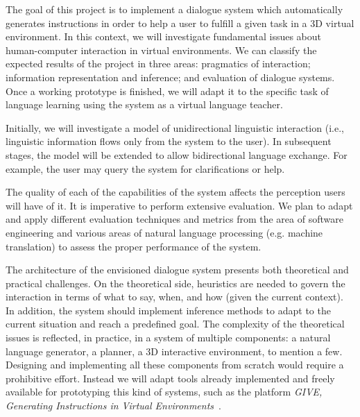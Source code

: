 
The goal of this project is to implement a dialogue system which automatically
generates instructions in order to help a user to fulfill a
given task in a 3D virtual environment. In this context, we will investigate
fundamental issues about human-computer interaction in virtual environments. We
can classify the expected results of the project in three areas: pragmatics
of interaction;  information representation and inference; and evaluation of
dialogue systems. Once a working prototype is finished, we will adapt it to
the specific task of language learning using the system as a virtual language
teacher. 

Initially, we will investigate a model of unidirectional linguistic
interaction (i.e., linguistic information flows only from the system to the
user). In subsequent stages, the model will be extended to allow bidirectional
language exchange. For example, the user may query the system for clarifications or help.

The quality of each of the capabilities of the system affects the perception
users will have of it. It is imperative to perform extensive evaluation. 
We plan to adapt and apply different evaluation techniques and
metrics from the area of software engineering and various areas of
natural language processing (e.g. machine translation) to assess the proper 
performance of the system.

The architecture of the envisioned dialogue system presents both theoretical and
practical challenges. On the theoretical side, heuristics are needed to govern
the interaction in terms of what to say, when, and how (given the current
context). In addition, the system should implement inference methods to 
adapt to the current situation and reach a predefined goal. The complexity of
the theoretical issues is reflected, in practice, in a system of
multiple components: a natural language generator, a planner,
a 3D interactive environment, to mention a few. Designing
and implementing all these components from scratch would 
require a prohibitive effort. Instead we will adapt tools already implemented 
and freely available for prototyping this kind of 
systems, such as the platform \emph{GIVE, Generating Instructions in Virtual
Environments}~\cite{byron09}. 


